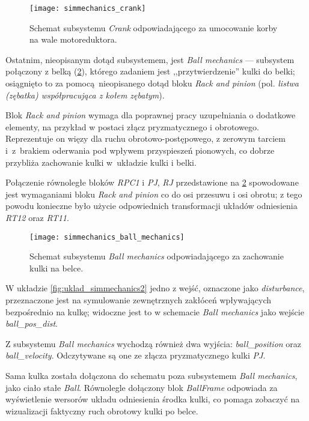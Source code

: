 \begin{figure}[h]
    \centering
    \texttt{[image: simmechanics\_crank]}
    \caption{Schemat subsystemu \textit{Crank} odpowiadającego za umocowanie korby na wale motoreduktora.}
    \label{fig:sm_crank}
\end{figure}

Ostatnim, nieopisanym dotąd subsystemem, jest \textit{Ball mechanics} --- subsystem połączony z belką (\cref{fig:sm_ball_mechanics}), którego zadaniem jest ,,przytwierdzenie'' kulki do belki; osiągnięto to za pomocą nieopisanego dotąd bloku \textit{Rack and pinion} (pol. \textit{listwa (zębatka) współpracująca z kołem zębatym}).

Blok \textit{Rack and pinion} wymaga dla poprawnej pracy uzupełniania o dodatkowe elementy, na przykład w postaci złącz pryzmatycznego i obrotowego. Reprezentuje on więzy dla ruchu obrotowo-postępowego, z zerowym tarciem i~z~brakiem oderwania pod wpływem przyspieszeń pionowych, co dobrze przybliża zachowanie kulki w~układzie kulki i belki.

Połączenie równoległe bloków \textit{RPC1} i \textit{PJ}, \textit{RJ} przedstawione na \cref{fig:sm_ball_mechanics} spowodowane jest wymaganiami bloku \textit{Rack and pinion} co do osi przesuwu i osi obrotu; z tego powodu konieczne było użycie odpowiednich transformacji układów odniesienia \textit{RT12} oraz \textit{RT11}.

\begin{figure}[h]
    \centering
    \texttt{[image: simmechanics\_ball\_mechanics]}
    \caption{Schemat subsystemu \textit{Ball mechanics} odpowiadającego za zachowanie kulki na belce.}
    \label{fig:sm_ball_mechanics}
\end{figure}

W układzie \cref{fig:uklad_simmechanics2} jedno z wejść, oznaczone jako \textit{disturbance}, przeznaczone jest na symulowanie zewnętrznych zakłóceń wpływających bezpośrednio na kulkę; widoczne jest to w schemacie \textit{Ball mechanics} jako wejście \textit{ball\_pos\_dist}.

Z subsystemu \textit{Ball mechanics} wychodzą również dwa wyjścia: \textit{ball\_position} oraz \textit{ball\_velocity}. Odczytywane są one ze złącza pryzmatycznego kulki \textit{PJ}.

Sama kulka została dołączona do schematu poza subsystemem \textit{Ball mechanics}, jako ciało stałe \textit{Ball}. Równolegle dołączony blok \textit{BallFrame} odpowiada za wyświetlenie wersorów układu odniesienia środka kulki, co pomaga zobaczyć na wizualizacji faktyczny ruch obrotowy kulki po belce.

